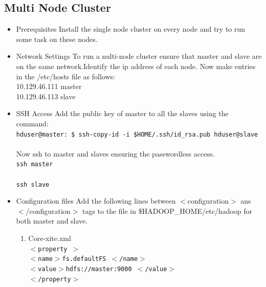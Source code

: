 \documentclass[12pt]{book}
\newcommand{\shellcmd}[1]{\\\indent\texttt{\footnotesize #1}\\}
\begin{document}
\subsection{Multi Node Cluster}
\begin{itemize}

\item Prerequisites 
Install the single node cluster on every node and try to run some task on these nodes.\cite{multi}
\item Network Settings 
To run a nulti-node cluster ensure that master and slave are on the same network.Identify the ip address of each node.
Now make entries in the /etc/hosts file as follows:\\
10.129.46.111 master\\
10.129.46.113 slave\\\indent

\item SSH Access 
Add the public key of master to all the slaves using the command:
\shellcmd{hduser@master:~\$ ssh-copy-id -i \$HOME/.ssh/id\_rsa.pub hduser@slave}\\
Now ssh to master and slaves ensuring the passwordless access.
\shellcmd{ssh master}
\shellcmd{ssh slave}

\item Configuration files 
Add the following lines between $<$configuration$>$ ans $<$/configuration$>$ tags to the file in \$HADOOP\_HOME/etc/hadoop
for both master and slave.
\begin{enumerate}
\item Core-xite.xml
       \shellcmd{$<$property $>$\\\indent 
                $<$name$>$fs.defaultFS $<$/name$>$ \\\indent 
                $<$value$>$hdfs://master:9000 $<$/value$>$\\\indent 
                $<$/property$>$\\\indent}


\end{enumerate}
\end{itemize}
\end{document}
